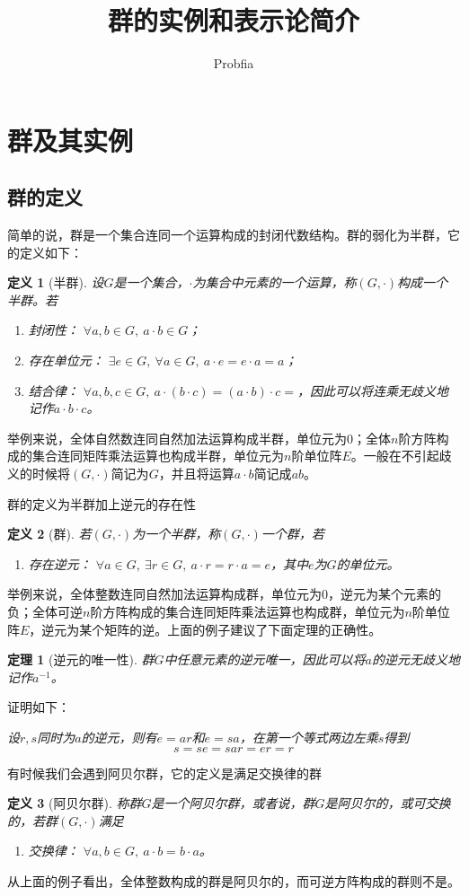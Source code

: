 \documentclass[a4paper,11pt]{ctexart}
\title{群的实例和表示论简介}
\author{Probfia}
\newcommand{\beq}{\begin{equation}}
\newcommand{\eeq}{\end{equation}}
\newtheorem{thm}{定理}[section]
\newtheorem{dfn}{定义}[section]
\begin{document}
\maketitle
\tableofcontents

\section{群及其实例}
\subsection{群的定义}
简单的说，群是一个集合连同一个运算构成的封闭代数结构。群的弱化为半群，它的定义如下：
\begin{dfn}[半群]
设$G$是一个集合，$\cdot$为集合中元素的一个运算，称$(G,\cdot)$构成一个半群。若
\begin{enumerate}
\item 封闭性： $\forall a,b \in G,\ a \cdot b \in G$；
\item 存在单位元： $\exists e \in G, \ \forall a \in G,\ a\cdot e = e \cdot a = a$；
\item 结合律： $\forall a,b,c \in G,\ a\cdot(b\cdot c) = (a \cdot b) \cdot c =$，因此可以将连乘无歧义地记作$a\cdot b\cdot c$。
\end{enumerate}
\end{dfn}
举例来说，全体自然数连同自然加法运算构成半群，单位元为$0$；全体$n$阶方阵构成的集合连同矩阵乘法运算也构成半群，单位元为$n$阶单位阵$E$。一般在不引起歧义的时候将$(G,\cdot)$简记为$G$，并且将运算$a \cdot b$简记成$ab$。
\par
群的定义为半群加上逆元的存在性
\begin{dfn}[群]
若$(G,\cdot)$为一个半群，称$(G,\cdot)$一个群，若
\begin{enumerate}
\item 存在逆元： $\forall a \in G,\ \exists r \in G,\ a\cdot r = r\cdot a = e$，其中$e$为$G$的单位元。
\end{enumerate}
\end{dfn}
举例来说，全体整数连同自然加法运算构成群，单位元为$0$，逆元为某个元素的负；全体可逆$n$阶方阵构成的集合连同矩阵乘法运算也构成群，单位元为$n$阶单位阵$E$，逆元为某个矩阵的逆。上面的例子建议了下面定理的正确性。
\begin{thm}[逆元的唯一性]
群$G$中任意元素的逆元唯一，因此可以将$a$的逆元无歧义地记作$a^{-1}$。
\end{thm}
证明如下：\par
\emph{设$r,s$同时为$a$的逆元，则有$e = ar$和$e = sa$，在第一个等式两边左乘$s$得到
\beq
s = se = sar = er = r
\eeq
}
\par
有时候我们会遇到阿贝尔群，它的定义是满足交换律的群
\begin{dfn}[阿贝尔群]
称群$G$是一个阿贝尔群，或者说，群$G$是阿贝尔的，或可交换的，若群$(G,\cdot)$满足
\begin{enumerate}
\item 交换律： $\forall a,b \in G,\ a\cdot b = b \cdot a$。
\end{enumerate}
\end{dfn}
从上面的例子看出，全体整数构成的群是阿贝尔的，而可逆方阵构成的群则不是。
\end{document}
